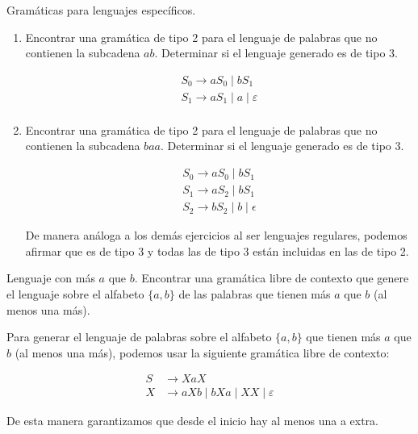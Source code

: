\documentclass[12pt]{book} %
\begin{document}
\begin{ejercicio}
Gramáticas para lenguajes específicos.

\begin{enumerate}[label=\alph*)]
    \item Encontrar una gramática de tipo 2 para el lenguaje de palabras que no contienen la subcadena $ab$.  
    Determinar si el lenguaje generado es de tipo 3.

    \begin{solucion}[a]

    \begin{align*}
    S_0  \rightarrow aS_0  \mid bS_1 \\
    S_1  \rightarrow aS_1 \mid a \mid \varepsilon \\
    \end{align*}

    \end{solucion}

    \item Encontrar una gramática de tipo 2 para el lenguaje de palabras que no contienen la subcadena $baa$.  
    Determinar si el lenguaje generado es de tipo 3.

    \begin{solucion}[b]
    \begin{align*}
    S_0  \rightarrow aS_0  \mid bS_1 \\
    S_1  \rightarrow aS_2 \mid bS_1 \\
    S_2  \rightarrow bS_2 \mid b  \mid \epsilon
    \end{align*}

    De manera análoga a los demás ejercicios al ser lenguajes regulares, podemos afirmar que es de tipo 3 y todas las de tipo 3 están incluidas en las de tipo 2.

    \end{solucion}

\end{enumerate}

\end{ejercicio}

\begin{ejercicio}
Lenguaje con más $a$ que $b$. Encontrar una gramática libre de contexto que genere el lenguaje sobre el alfabeto $\{a, b\}$ de las palabras que tienen más $a$ que $b$ (al menos una más).
\end{ejercicio}

\begin{solucion}

Para generar el lenguaje de palabras sobre el alfabeto $\{a, b\}$ que tienen más $a$ que $b$ (al menos una más), podemos usar la siguiente gramática libre de contexto:

\begin{align*}
S &\to XaX \\
X &\to aXb \mid bXa \mid XX \mid \varepsilon
\end{align*}

De esta manera garantizamos que desde el inicio hay al menos una a extra.


\end{solucion}
\end{document}
